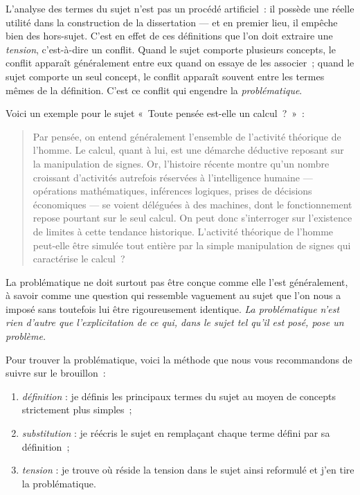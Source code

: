 \documentclass[a4paper]{article}
\begin{document}
L'analyse des termes du sujet n'est pas un procédé artificiel : il
possède une réelle utilité dans la construction de la dissertation ---
et en premier lieu, il empêche bien des hors-sujet. C'est en effet de
ces définitions que l'on doit extraire une \emph{tension}, c'est-à-dire un
conflit. Quand le sujet comporte plusieurs concepts, le conflit apparaît
généralement entre eux quand on essaye de les associer ; quand le sujet
comporte un seul concept, le conflit apparaît souvent entre les termes
mêmes de la définition. C'est ce conflit qui engendre la
\emph{problématique}.

Voici un exemple pour le sujet « Toute pensée est-elle un calcul ? » :

\begin{quote}
Par pensée, on entend généralement l'ensemble de l'activité théorique
de l'homme. Le calcul, quant à lui, est une démarche déductive
reposant sur la manipulation de signes. Or, l'histoire récente montre
qu'un nombre croissant d'activités autrefois réservées à
l'intelligence humaine --- opérations mathématiques, inférences
logiques, prises de décisions économiques --- se voient déléguées à
des machines, dont le fonctionnement repose pourtant sur le seul
calcul. On peut donc s'interroger sur l'existence de limites à cette
tendance historique. L'activité théorique de l'homme peut-elle être
simulée tout entière par la simple manipulation de signes qui
caractérise le calcul ?
\end{quote}

La problématique ne doit surtout pas être conçue comme elle l'est
généralement, à savoir comme une question qui ressemble vaguement au
sujet que l'on nous a imposé sans toutefois lui être rigoureusement
identique. \emph{La problématique n'est rien d'autre que l'explicitation de ce qui, dans le sujet tel qu'il est posé, pose un problème.} 

Pour trouver la problématique, voici la méthode que nous vous
recommandons de suivre sur le brouillon :

\begin{enumerate}
\item \emph{définition} : je définis les principaux termes du sujet au moyen de
   concepts strictement plus simples ;
\item \emph{substitution} : je réécris le sujet en remplaçant chaque terme
   défini par sa définition ;
\item \emph{tension} : je trouve où réside la tension dans le sujet ainsi
   reformulé et j'en tire la problématique.
\end{enumerate}
\end{document}

